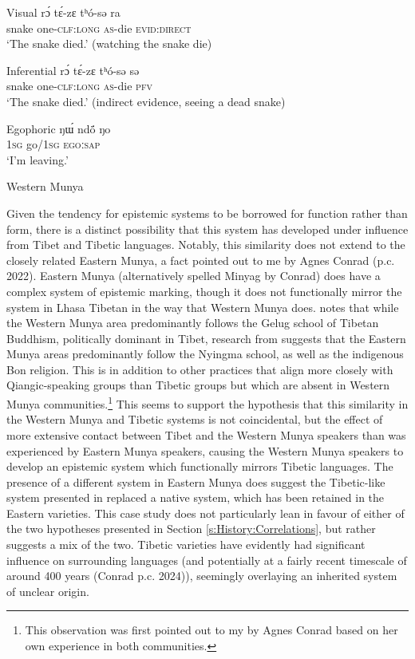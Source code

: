 \begin{exe}
    \ex\label{e:History:WesternMunya}
    \begin{xlist}
\ex Visual
\gll rɔ́ tɛ́-zɛ tʰó-sə ra \\
snake one-\textsc{clf:long} \textsc{as}-die \textsc{evid:direct} \\
\glt ‘The snake died.’ (watching the snake die)

\ex Inferential
\gll rɔ́ tɛ́-zɛ tʰó-sə sə \\
snake one-\textsc{clf:long} \textsc{as}-die \textsc{pfv} \\
\glt ‘The snake died.’ (indirect evidence, seeing a dead snake)

\ex Egophoric
\gll ŋɯ́ ndö́ ŋo \\
\textsc{1sg} go/\textsc{1sg} \textsc{egoːsap} \\
\glt ‘I’m leaving.’
    \end{xlist}
Western Munya \cite[Qiangic: PRC,][241, 247]{Bai2019}
\end{exe}

Given the tendency for epistemic systems to be borrowed for function rather than form, there is a distinct possibility that this system has developed under influence from Tibet and Tibetic languages. Notably, this similarity does not extend to the closely related Eastern Munya, a fact pointed out to me by Agnes Conrad (p.c. 2022). Eastern Munya (alternatively spelled Minyag by Conrad) does have a complex system of epistemic marking, though it does not functionally mirror the system in Lhasa Tibetan in the way that Western Munya does.  notes that while the Western Munya area predominantly follows the Gelug school of Tibetan Buddhism, politically dominant in Tibet, research from \cite{Li2006} suggests that the Eastern Munya areas predominantly follow the Nyingma school, as well as the indigenous Bon religion. This is in addition to other practices that align more closely with Qiangic-speaking groups than Tibetic groups but which are absent in Western Munya communities.\footnote{This observation was first pointed out to my by Agnes Conrad based on her own experience in both communities.} This seems to support the hypothesis that this similarity in the Western Munya and Tibetic systems is not coincidental, but the effect of more extensive contact between Tibet and the Western Munya speakers than was experienced by Eastern Munya speakers, causing the Western Munya speakers to develop an epistemic system which functionally mirrors Tibetic languages. The presence of a different system in Eastern Munya does suggest the Tibetic-like system presented in  replaced a native system, which has been retained in the Eastern varieties. This case study does not particularly lean in favour of either of the two hypotheses presented in Section \ref{s:History:Correlations}, but rather suggests a mix of the two. Tibetic varieties have evidently had significant influence on surrounding languages (and potentially at a fairly recent timescale of around 400 years (Conrad p.c. 2024)), seemingly overlaying an inherited system of unclear origin.

